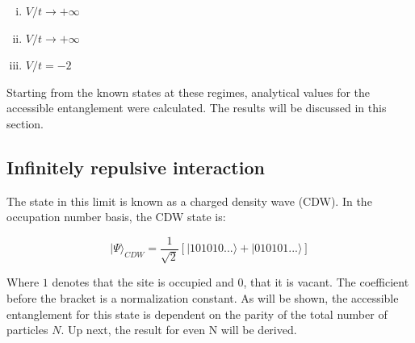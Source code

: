 	\begin{enumerate} [i)]
		
		\item$V/t \to +\infty $
		\item $V/t \to +\infty $
		\item $V/t = -2$
	\end{enumerate}
	
	Starting from the known states at these regimes, analytical values for the accessible entanglement were calculated. The results will be discussed in this section.

	\subsection{Infinitely repulsive interaction}
		The state in this limit is known as a charged density wave (CDW). In the occupation number basis, the CDW state is:

\begin{equation}
| \Psi \rangle_{CDW} = \frac{1}{\sqrt{2}} [|101010... \rangle + |010101... \rangle ] 
\end{equation}

Where $1$ denotes that the site is occupied and $0$, that it is vacant. The coefficient before the bracket is a normalization constant. As will be shown, the accessible entanglement for this state is dependent on the parity of the total number of particles $N$. Up next, the result for even N will be derived.

